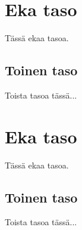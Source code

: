 \documentclass{jamk}
\begin{document}
\makejamktitle

\tableofcontents

\newpage

\section{Eka taso}
Tässä ekaa tasoa.

\subsection{Toinen taso}
Toista tasoa tässä...

\section{Eka taso}
Tässä ekaa tasoa.

\subsection{Toinen taso}
Toista tasoa tässä...
\end{document}

